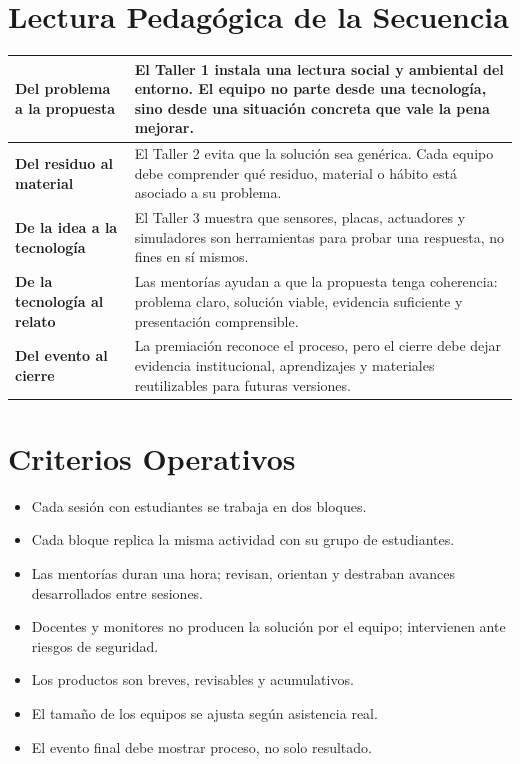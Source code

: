 \documentclass[10pt,letterpaper]{article}
\begin{document}
\section{Lectura Pedagógica de la Secuencia}

\begin{tabularx}{\textwidth}{L{3.1cm}Y}
\hline
\textbf{Del problema a la propuesta} & El Taller 1 instala una lectura social y ambiental del entorno. El equipo no parte desde una tecnología, sino desde una situación concreta que vale la pena mejorar. \\
\hline
\textbf{Del residuo al material} & El Taller 2 evita que la solución sea genérica. Cada equipo debe comprender qué residuo, material o hábito está asociado a su problema. \\
\hline
\textbf{De la idea a la tecnología} & El Taller 3 muestra que sensores, placas, actuadores y simuladores son herramientas para probar una respuesta, no fines en sí mismos. \\
\hline
\textbf{De la tecnología al relato} & Las mentorías ayudan a que la propuesta tenga coherencia: problema claro, solución viable, evidencia suficiente y presentación comprensible. \\
\hline
\textbf{Del evento al cierre} & La premiación reconoce el proceso, pero el cierre debe dejar evidencia institucional, aprendizajes y materiales reutilizables para futuras versiones. \\
\hline
\end{tabularx}

\section{Criterios Operativos}

\begin{multicols}{2}
\raggedcolumns
{}
\begin{itemize}
  \item Cada sesión con estudiantes se trabaja en dos bloques.
  \item Cada bloque replica la misma actividad con su grupo de estudiantes.
  \item Las mentorías duran una hora; revisan, orientan y destraban avances desarrollados entre sesiones.
  \item Docentes y monitores no producen la solución por el equipo; intervienen ante riesgos de seguridad.
  \item Los productos son breves, revisables y acumulativos.
  \item El tamaño de los equipos se ajusta según asistencia real.
  \item El evento final debe mostrar proceso, no solo resultado.
\end{itemize}
\end{multicols}
\end{document}
